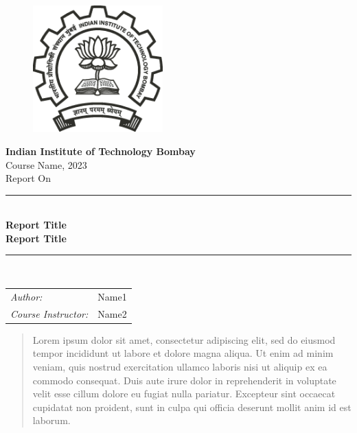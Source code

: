 \documentclass[12pt]{article}
\begin{document}
\begin{figure}
	\centering
	\includegraphics[width=5cm]{iitb.eps}
\end{figure}


\begin{center}
	\textbf{\LARGE Indian Institute of Technology Bombay} \\
	\vspace{1cm}
	\Large Course Name, 2023\\
	\vspace{0.3cm}
	\large Report  On\\

	\rule{\linewidth}{0.5pt} \\
	\vspace{0.2cm}
	\textbf{\LARGE Report Title \\ \vspace{0.3cm} Report Title} \\
	\vspace{0.1cm}
	\rule{\linewidth}{0.5pt} \\

	\vspace{1.5cm}

	\begin{tabular}{lr}
		\textit{Author:} & Name1 \\
        \textit{Course Instructor:} & Name2\\
	\end{tabular}

	\vspace{1cm}
	\date{}
\end{center}

\newpage

\begin{abstract}
    Lorem ipsum dolor sit amet, consectetur adipiscing elit, sed do eiusmod tempor incididunt ut labore et dolore magna aliqua. Ut enim ad minim veniam, quis nostrud exercitation ullamco laboris nisi ut aliquip ex ea commodo consequat. Duis aute irure dolor in reprehenderit in voluptate velit esse cillum dolore eu fugiat nulla pariatur. Excepteur sint occaecat cupidatat non proident, sunt in culpa qui officia deserunt mollit anim id est laborum.
\end{abstract}
\end{document}
